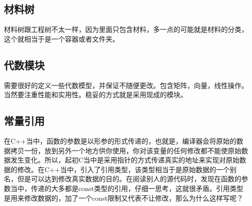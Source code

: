 \subsection{材料树}
材料树跟工程树不太一样，因为里面只包含材料，多一点的可能就是材料的分类，这个就相当于是一个容器或者文件夹。
\subsection{代数模块}
需要很好的定义一些代数模型，并保证不随便更改。包含矩阵，向量，线性操作。当然要注重性能和实用性。稳妥的方式就是采用现成的模块。
\subsection{常量引用}
在C++当中，函数的参数是以形参的形式传递的，也就是，编译器会将原始的数据拷贝一份，放到另外一个地方供你使用，你对该变量的任何修改都不能使原始数据发生变化。所以，起初C当中是采用指针的方式传递真实的地址来实现对原始数据的修改。在C++当中，引入了引用类型，该类型相当于是原始数据的一个别名，但是可以达到修改真实数据的目的。在阅读别人的源代码时，发现在函数的参数当中，传递的大多都是const类型的引用，仔细一思考，这就很矛盾。引用类型是用来修改数据的，加了一个const限制又代表不让修改，那么为什么这样写呢？